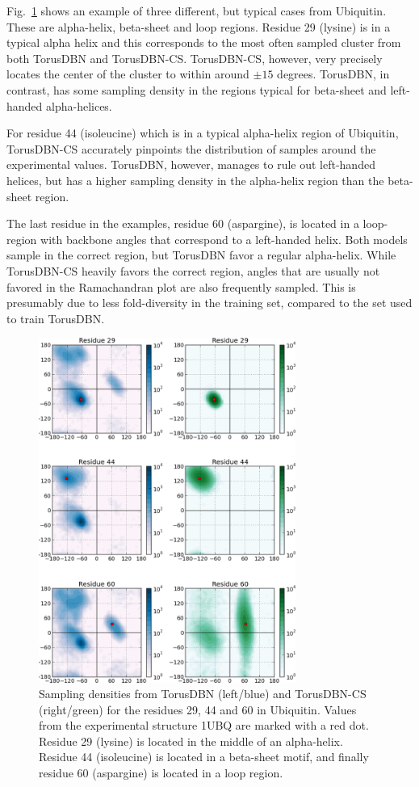 Fig.~\ref{fig:torus} shows an example of three different, but typical cases from Ubiquitin. These are alpha-helix, beta-sheet and loop regions.
Residue 29 (lysine) is in a typical alpha helix and this corresponds to the most often sampled cluster from both TorusDBN and TorusDBN-CS. TorusDBN-CS, however, very precisely locates the center of the cluster to within around $\pm 15$ degrees. TorusDBN, in contrast, has some sampling density in the regions typical for beta-sheet and left-handed alpha-helices.

For residue 44 (isoleucine) which is in a typical alpha-helix region of Ubiquitin, TorusDBN-CS accurately pinpoints the distribution of samples around the experimental values.
TorusDBN, however, manages to rule out left-handed helices, but has a higher sampling density in the alpha-helix region than the beta-sheet region. 

The last residue in the examples, residue 60 (aspargine), is located in a loop-region with backbone angles that correspond to a left-handed helix.
Both models sample in the correct region, but TorusDBN favor a regular alpha-helix.
While TorusDBN-CS heavily favors the correct region, angles that are usually not favored in the Ramachandran plot are also frequently sampled.
This is presumably due to less fold-diversity in the training set, compared to the set used to train TorusDBN.


\begin{figure}
    \centering
    \includegraphics[width=0.75\textwidth]{figures/torus_versions.pdf}
    \caption{Sampling densities from TorusDBN (left/blue) and TorusDBN-CS (right/green) for the residues 29, 44 and 60 in Ubiquitin. Values from the experimental structure 1UBQ are marked with a red dot. Residue 29 (lysine) is located in the middle of an alpha-helix. Residue 44 (isoleucine) is located in a beta-sheet motif, and finally residue 60 (aspargine) is located in a loop region.}
    \label{fig:torus}
\end{figure}


